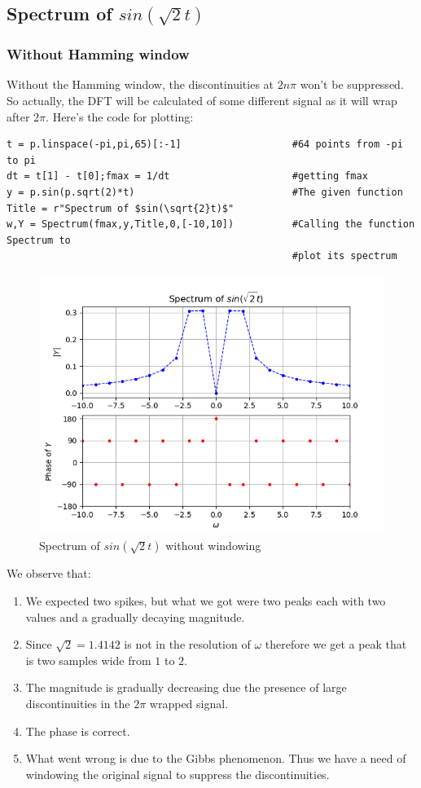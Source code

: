 \documentclass[11pt, a4paper]{article}
\begin{document}
    \subsection{Spectrum of $sin(\sqrt{2}t)$}
        \subsubsection{Without Hamming window}
        Without the Hamming window, the discontinuities at $2n\pi$ won't be suppressed. So actually, the DFT will be calculated of some different signal as it will wrap after $2\pi$. Here's the code for plotting:
            \begin{verbatim}
t = p.linspace(-pi,pi,65)[:-1]                   #64 points from -pi to pi
dt = t[1] - t[0];fmax = 1/dt                     #getting fmax
y = p.sin(p.sqrt(2)*t)                           #The given function
Title = r"Spectrum of $sin(\sqrt{2}t)$"
w,Y = Spectrum(fmax,y,Title,0,[-10,10])          #Calling the function Spectrum to
                                                 #plot its spectrum
            \end{verbatim}
            \begin{figure}[!h]
                \centering
                \includegraphics[scale = 0.65]{Figure 0.png}
                \caption{Spectrum of $sin(\sqrt{2}t)$ without windowing}
                \label{fig:Figure 0}
            \end{figure}
        We observe that:
            \begin{enumerate}
            \item We expected two spikes, but what we got were two peaks each with two values and a gradually decaying magnitude.
            \item Since $\sqrt{2} = 1.4142$ is not in the resolution of $\omega$ therefore we get a peak that is two samples wide from $1$ to $2$.
            \item The magnitude is gradually decreasing due the presence of large discontinuities in the $2\pi$ wrapped signal.
            \item The phase is correct.
            \item What went wrong is due to the Gibbs phenomenon. Thus we have a need of windowing the original signal to suppress the discontinuities.
            \end{enumerate}
\end{document}
